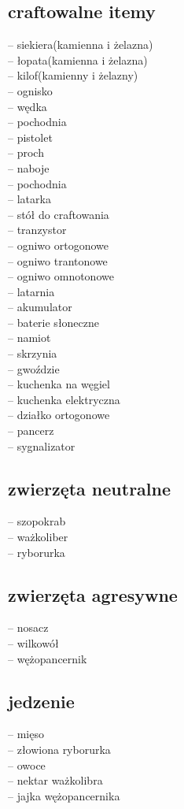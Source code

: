 \documentclass[22pt]{article}
\begin{document}
\subsection{craftowalne itemy}
-- siekiera(kamienna i żelazna)\\
-- łopata(kamienna i żelazna)\\
-- kilof(kamienny i żelazny)\\
-- ognisko\\
-- wędka\\
-- pochodnia\\
-- pistolet\\
-- proch\\
-- naboje\\
-- pochodnia\\
-- latarka\\
-- stół do craftowania\\
-- tranzystor\\
-- ogniwo ortogonowe\\
-- ogniwo trantonowe\\
-- ogniwo omnotonowe\\
-- latarnia\\
-- akumulator\\
-- baterie słoneczne\\
-- namiot\\
-- skrzynia\\
-- gwoździe\\
-- kuchenka na węgiel\\
-- kuchenka elektryczna\\
-- działko ortogonowe\\
-- pancerz\\
-- sygnalizator\\
\subsection{zwierzęta neutralne}
-- szopokrab\\
-- ważkoliber\\
-- ryborurka\\
\subsection{zwierzęta agresywne}
-- nosacz\\
-- wilkowół\\
-- wężopancernik\\
\subsection{jedzenie}
-- mięso\\
-- złowiona ryborurka\\
-- owoce\\
-- nektar ważkolibra\\
-- jajka wężopancernika\\
\end{document}
